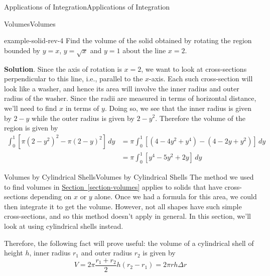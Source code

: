 \documentclass[10pt,]{book}
\numberwithin{equation}{section}
\newcommand{\amp}{&}
\begin{document}
\begin{chapterptx}{Applications of Integration}{}{Applications of Integration}{}{}
\begin{sectionptx}{Volumes}{}{Volumes}{}{}
\begin{example}{}{example-solid-rev-4}%
\hypertarget{p-636}{}%
Find the volume of the solid obtained by rotating the region bounded by \(y = x\), \(y = \sqrt{x}\) and \(y = 1\) about the line \(x = 2\).%
\par\smallskip%
\noindent\textbf{Solution}.\hypertarget{solution-139}{}\quad%
\hypertarget{p-637}{}%
Since the axis of rotation is \(x = 2\), we want to look at cross-sections perpendicular to this line, i.e., parallel to the \(x\)-axis. Each such cross-section will look like a washer, and hence its area will involve the inner radius and outer radius of the washer. Since the radii are measured in terms of horizontal distance, we'll need to find \(x\) in terms of \(y\). Doing so, we see that the inner radius is given by \(2 - y\) while the outer radius is given by \(2 - y^{2}\). Therefore the volume of the region is given by%
\begin{align*}
\int_{0}^{1}\left[\pi(2 - y^{2})^{2} - \pi(2 - y)^{2}\right]\,dy \amp= \pi\int_{0}^{1}\left[(4 - 4y^{2} + y^{4}) - (4 - 2y + y^{2})\right]\,dy\\
\amp= \pi\int_{0}^{1}\left[y^{4} - 5y^{2} + 2y\right]\,dy
\end{align*}
%
\end{example}
\end{sectionptx}
%
%
\typeout{************************************************}
\typeout{************************************************}
%
\begin{sectionptx}{Volumes by Cylindrical Shells}{}{Volumes by Cylindrical Shells}{}{}\label{section-volumes-by-cylindrical-shells}
\hypertarget{p-638}{}%
The method we used to find volumes in \hyperref[section-volumes]{Section~\ref{section-volumes}} applies to solids that have cross-sections depending on \(x\) or \(y\) alone. Once we had a formula for this area, we could then integrate it to get the volume. However, not all shapes have such simple cross-sections, and so this method doesn't apply in general. In this section, we'll look at using cylindrical shells instead.%
\par
\hypertarget{p-639}{}%
Therefore, the following fact will prove useful: the volume of a cylindrical shell of height \(h\), inner radius \(r_{1}\) and outer radius \(r_{2}\) is given by%
\begin{equation}
V = 2\pi\frac{r_{1} + r_{2}}{2}h(r_{2} - r_{1}) = 2\pi rh\Delta r\label{equation-volume-cylindrical-shell}
\end{equation}

\end{sectionptx}
\end{chapterptx}
\end{document}
